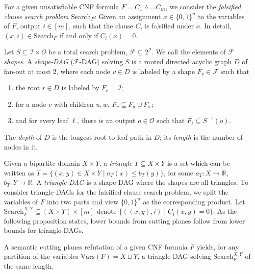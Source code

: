 \documentclass[10pt,a4paper]{article}
\theoremstyle{definition}
\theoremstyle{remark}
\theoremstyle{example}
\theoremstyle{plain}
\newcommand{\R}{\mathbb{R}}
\newcommand{\search}{\mathrm{Search}}
\begin{document}
For a given unsatisfiable CNF formula $F= C_1\land \dots C_m$, we consider the \emph{falsified clause search problem $\search_{F}$}: Given an assignment $x\in \{0,1\}^n$ to the variables of $F$, output $i\in [m]$, such that the clause $C_i$ is falsified under $x$. In detail, $(x,i)\in \search_F$ if and only if $C_i(x)=0$. 

\begin{definition}
    Let $S\subseteq \mathcal{I}\times \mathcal{O}$ be a total search problem, $\mathcal{F}\subseteq 2^{\mathcal{I}}$. We call the elements of $\mathcal{F}$ \emph{shapes}.
    A \emph{shape-DAG} ($\mathcal{F}$-DAG) solving $S$ is a rooted directed acyclic graph $D$ of fan-out at most $2$, where each node $v\in D$ is labeled by a shape $F_v\in \mathcal{F}$ such that 
    \begin{enumerate}
        \item the root $r\in D$ is labeled by $F_r=\mathcal{I}$;
        \item for a node $v$ with children $u,w$, $F_v\subseteq F_u \cup F_w$; 
        \item and for every leaf $
        \ell$, there is an output $o \in \mathcal{O}$ such that $F_{\ell}\subseteq S^{-1}(o)$.
    \end{enumerate}
    The \emph{depth} of $D$ is the longest root-to-leaf path in $D$; its \emph{length} is the number of nodes in it.
\end{definition}

Given a bipartite domain $X\times Y$, a \emph{triangle} $T\subseteq X \times Y$ is a set which can be written as $T=\{(x,y)\in X\times Y \mid a_T(x)\leq b_T(y)\}$, for some $a_T\colon X \rightarrow \R$, $b_T\colon Y \rightarrow \R$. 
A \emph{triangle-DAG} is a shape-DAG where the shapes are all triangles. To consider triangle-DAGs for the falsified clause search problem, we split the variables of $F$ into two parts and view $\{0,1\}^n$ as the corresponding product. Let $\search_F^{X,Y}\subseteq (X\times Y) \times [m]$ denote $\{((x,y),i) \mid C_i(x,y)=0\}$.
As the following proposition states, lower bounds from cutting planes follow from lower bounds for triangle-DAGs.
\begin{proposition}\label{prop:CP-to-triangleDAG}
A semantic cutting planes refutation of a given CNF formula $F$ yields, for any partition of the variables $\textrm{Vars}(F)=X\sqcup Y$, a triangle-DAG solving $\search_F^{X,Y}$ of the same length.
\end{proposition}
\end{document}
